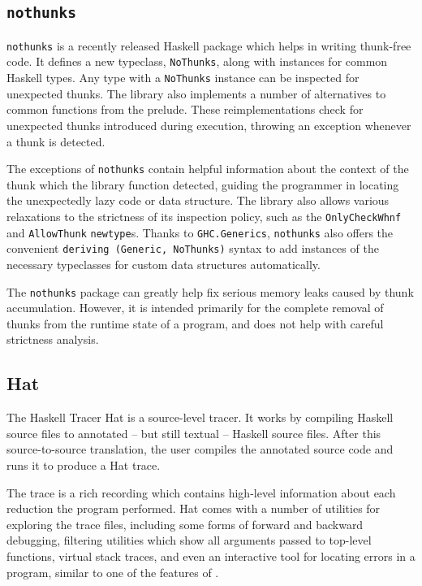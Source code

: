\documentclass[thesis=B,english]{FITthesis}[2019/12/23]
\newcommand{\hackage}[1]{\texttt{#1}}
\newcommand{\hsType}[1]{\texttt{#1}}
\newcommand{\hsModule}[1]{\texttt{#1}}
\newcommand{\hsTC}[1]{\texttt{#1}}
\newcommand{\hsCode}[1]{\texttt{#1}}
\begin{document}
\subsection*{\hackage{nothunks}} \label{sec:nothunks}
\hackage{nothunks} is a recently released Haskell package which helps in writing
thunk-free code. It defines a new typeclass, \hsTC{NoThunks}, along with
instances for common Haskell types. Any type with a \hsTC{NoThunks} instance
can be inspected for unexpected thunks. The library also implements a number of
alternatives to common functions from the prelude. These re\-implementations
check for unexpected thunks introduced during execution, throwing an exception
whenever a thunk is detected.

The exceptions of \hackage{nothunks} contain helpful information about the
context of the thunk which the library function detected, guiding the
programmer in locating the unexpectedly lazy code or data structure. The
library also allows various relaxations to the strictness of its inspection
policy, such as the \hsType{OnlyCheckWhnf} and \hsType{AllowThunk}
\hsCode{newtype}s. Thanks to \hsModule{GHC.Generics}\cite{ghc-generics},
\hackage{nothunks} also offers the convenient \hsCode{deriving (Generic,
NoThunks)} syntax to add instances of the necessary typeclasses for custom data
structures automatically.

The \hackage{nothunks} package can greatly help fix serious memory leaks caused
by thunk accumulation. However, it is intended primarily for the complete
removal of thunks from the runtime state of a program, and does not help with
careful strictness analysis.

\subsection*{Hat} \label{sec:hat}
The Haskell Tracer Hat\cite{proj-hat} is a source-level tracer. It works by
compiling Haskell source files to annotated -- but still textual -- Haskell
source files. After this source-to-source translation, the user compiles the
annotated source code and runs it to produce a Hat trace.

The trace is a rich recording which contains high-level information about each
reduction the program performed. Hat comes with a number of utilities for
exploring the trace files, including some forms of forward and backward
debugging, filtering utilities which show all arguments passed to top-level
functions, virtual stack traces, and even an interactive tool for locating
errors in a program, similar to one of the features of .
\end{document}
